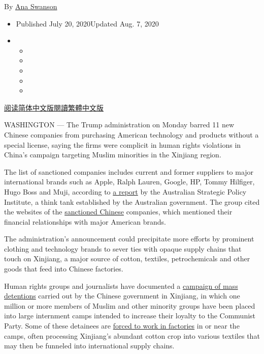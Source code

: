 By \href{https://www.nytimes3xbfgragh.onion/by/ana-swanson}{Ana Swanson}

\begin{itemize}
\item
  Published July 20, 2020Updated Aug. 7, 2020
\item
  \begin{itemize}
  \item
  \item
  \item
  \item
  \item
  \end{itemize}
\end{itemize}

\href{https://cn.nytimes3xbfgragh.onion/business/20200721/china-sanctions-uighurs-labor/}{阅读简体中文版}\href{https://cn.nytimes3xbfgragh.onion/business/20200721/china-sanctions-uighurs-labor/zh-}{閱讀繁體中文版}

WASHINGTON --- The Trump administration on Monday barred 11 new Chinese
companies from purchasing American technology and products without a
special license, saying the firms were complicit in human rights
violations in China's campaign targeting Muslim minorities in the
Xinjiang region.

The list of sanctioned companies includes current and former suppliers
to major international brands such as Apple, Ralph Lauren, Google, HP,
Tommy Hilfiger, Hugo Boss and Muji, according to
\href{https://www.aspi.org.au/report/uyghurs-sale}{a report} by the
Australian Strategic Policy Institute, a think tank established by the
Australian government. The group cited the websites of the
\href{https://www.nytimes3xbfgragh.onion/2020/08/07/world/asia/trump-china-hong-kong-sanctions.html}{sanctioned
Chinese} companies, which mentioned their financial relationships with
major American brands.

The administration's announcement could precipitate more efforts by
prominent clothing and technology brands to sever ties with opaque
supply chains that touch on Xinjiang, a major source of cotton,
textiles, petrochemicals and other goods that feed into Chinese
factories.

Human rights groups and journalists have documented a
\href{https://www.nytimes3xbfgragh.onion/interactive/2019/11/16/world/asia/china-xinjiang-documents.html}{campaign
of mass detentions} carried out by the Chinese government in Xinjiang,
in which one million or more members of Muslim and other minority groups
have been placed into large internment camps intended to increase their
loyalty to the Communist Party. Some of these detainees are
\href{https://www.nytimes3xbfgragh.onion/2018/12/16/world/asia/xinjiang-china-forced-labor-camps-uighurs.html}{forced
to work in factories} in or near the camps, often processing Xinjiang's
abundant cotton crop into various textiles that may then be funneled
into international supply chains.


